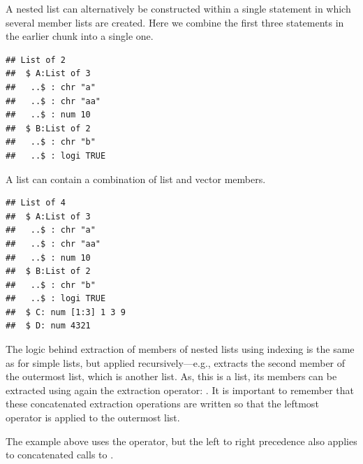 \documentclass[krantz2]{krantz}\usepackage{knitr}
\begin{document}
A nested list can alternatively be constructed within a single statement in which several member lists are created. Here we combine the first three statements in the earlier chunk into a single one.

\begin{knitrout}\footnotesize
{}\color{fgcolor}\begin{kframe}
\begin{alltt}
 \hlkwb{<-} \hlstd{(} \hlstd{=} \hlstd{(}\hlstd{,} \hlstd{,} \hlstd{),}  \hlstd{=} \hlstd{(}\hlstd{,} \hlstd{))}
\end{alltt}
\begin{verbatim}
## List of 2
##  $ A:List of 3
##   ..$ : chr "a"
##   ..$ : chr "aa"
##   ..$ : num 10
##  $ B:List of 2
##   ..$ : chr "b"
##   ..$ : logi TRUE
\end{verbatim}
\end{kframe}
\end{knitrout}

A list can contain a combination of list and vector members.

\begin{knitrout}\footnotesize
{}\color{fgcolor}\begin{kframe}
\begin{alltt}
 \hlkwb{<-} \hlstd{(} \hlstd{=} \hlstd{(}\hlstd{,} \hlstd{,} \hlstd{),}
                     \hlstd{=} \hlstd{(}\hlstd{,} \hlstd{),}
                     \hlstd{=} \hlstd{(}\hlstd{,} \hlstd{,} \hlstd{),}
                     \hlstd{=} \hlstd{)}
\end{alltt}
\begin{verbatim}
## List of 4
##  $ A:List of 3
##   ..$ : chr "a"
##   ..$ : chr "aa"
##   ..$ : num 10
##  $ B:List of 2
##   ..$ : chr "b"
##   ..$ : logi TRUE
##  $ C: num [1:3] 1 3 9
##  $ D: num 4321
\end{verbatim}
\end{kframe}
\end{knitrout}

\begin{explainbox}
The logic behind extraction of members of nested lists using indexing is the same as for simple lists, but applied recursively---e.g.,  extracts the second member of the outermost list, which is another list. As, this is a list, its members can be extracted using again the extraction operator: . It is important to remember that these concatenated extraction operations are written so that the leftmost operator is applied to the outermost list.

The example above uses the \Roperator{[[ ]]} operator, but the left to right precedence also applies to concatenated calls to \Roperator{[ ]}.
\end{explainbox}
\end{document}
